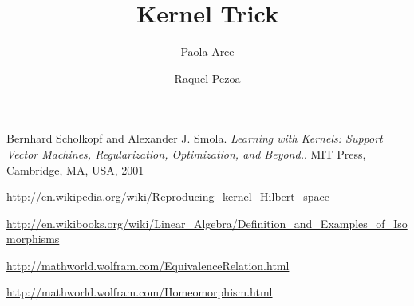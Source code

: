 \documentclass[12pt,reqno]{amsart}
\title{Kernel Trick}
\author{Paola Arce \and Raquel Pezoa}
\begin{document}
\maketitle










\begin{thebibliography}{9}

Bernhard Scholkopf and Alexander J. Smola. 
\emph{Learning with Kernels: Support Vector Machines, 
Regularization, Optimization, and Beyond.}.
MIT Press, Cambridge, MA, USA, 2001

\url{http://en.wikipedia.org/wiki/Reproducing_kernel_Hilbert_space}

\url{http://en.wikibooks.org/wiki/Linear_Algebra/Definition_and_Examples_of_Isomorphisms}

\url{http://mathworld.wolfram.com/EquivalenceRelation.html}

\url{http://mathworld.wolfram.com/Homeomorphism.html}


\end{thebibliography}
\end{document}
